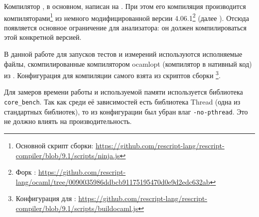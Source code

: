 Компилятор \rescript{}, в основном, написан на \ocaml.
При этом его компиляция производится
компиляторами\footnote{Основной скрипт сборки: \url{https://github.com/rescript-lang/rescript-compiler/blob/9.1/scripts/ninja.js}}
из немного модифицированной версии \ocaml{}
4.06.1\footnote{Форк \ocaml: \url{https://github.com/rescript-lang/ocaml/tree/0090035986ddbcb91175195470d0e9d2edc632ab}}
(далее \ocamlbs).
Отсюда появляется основное ограничение для анализатора:
он должен компилироваться этой конкретной версией.

В данной работе для запусков тестов и измерений используются исполняемые файлы,
скомпилированные компилятором ocamlopt (компилятор в нативный код) из \ocamlbs.
Конфигурация для компиляции самого \ocamlbs{} взята из скриптов сборки \rescript
\footnote{Конфигурация для \ocamlbs: \url{https://github.com/rescript-lang/rescript-compiler/blob/9.1/scripts/buildocaml.js}}.

Для замеров времени работы и используемой памяти используется библиотека \verb=core_bench=.
Так как среди её зависимостей есть библиотека Thread (одна из стандартных библиотек), то из конфигурации \ocamlbs{}
был убран влаг \verb=-no-pthread=.
Это не должно влиять на производительность.
